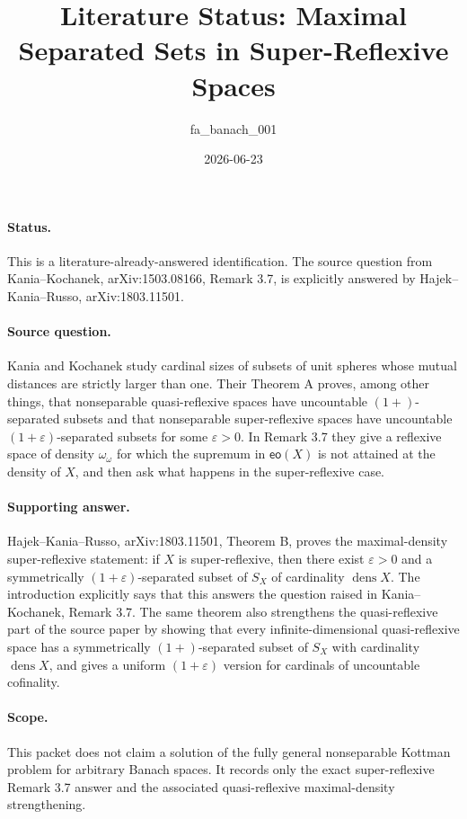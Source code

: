 \documentclass[11pt]{article}
\title{Literature Status: Maximal Separated Sets in Super-Reflexive Spaces}
\author{fa\_banach\_001}
\date{2026-06-23}
\newcommand{\dens}{\operatorname{dens}}
\begin{document}
\maketitle

\paragraph{Status.}
This is a literature-already-answered identification.  The source question
from Kania--Kochanek, arXiv:1503.08166, Remark 3.7, is explicitly answered by
Hajek--Kania--Russo, arXiv:1803.11501.

\paragraph{Source question.}
Kania and Kochanek study cardinal sizes of subsets of unit spheres whose
mutual distances are strictly larger than one.  Their Theorem A proves, among
other things, that nonseparable quasi-reflexive spaces have uncountable
$(1+)$-separated subsets and that nonseparable super-reflexive spaces have
uncountable $(1+\varepsilon)$-separated subsets for some $\varepsilon>0$.
In Remark 3.7 they give a reflexive space of density $\omega_\omega$ for
which the supremum in $\mathsf{eo}(X)$ is not attained at the density of
$X$, and then ask what happens in the super-reflexive case.

\paragraph{Supporting answer.}
Hajek--Kania--Russo, arXiv:1803.11501, Theorem B, proves the maximal-density
super-reflexive statement: if $X$ is super-reflexive, then there exist
$\varepsilon>0$ and a symmetrically $(1+\varepsilon)$-separated subset of
$S_X$ of cardinality $\dens X$.  The introduction explicitly says that this
answers the question raised in Kania--Kochanek, Remark 3.7.  The same theorem
also strengthens the quasi-reflexive part of the source paper by showing that
every infinite-dimensional quasi-reflexive space has a symmetrically
$(1+)$-separated subset of $S_X$ with cardinality $\dens X$, and gives a
uniform $(1+\varepsilon)$ version for cardinals of uncountable cofinality.

\paragraph{Scope.}
This packet does not claim a solution of the fully general nonseparable
Kottman problem for arbitrary Banach spaces.  It records only the exact
super-reflexive Remark 3.7 answer and the associated quasi-reflexive
maximal-density strengthening.
\end{document}
